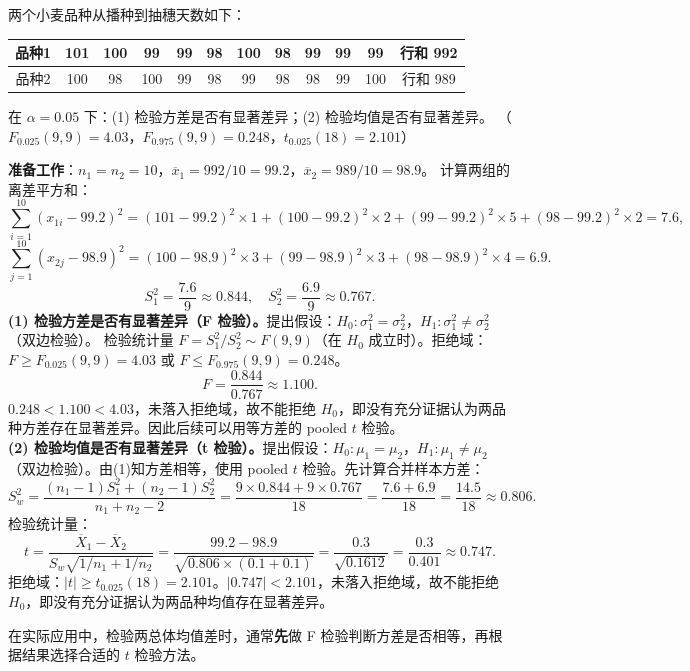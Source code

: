 ﻿\documentclass[lang=cn,11pt]{elegantbook}
\begin{document}
\begin{exercise}\label{exer:9-f-test}
两个小麦品种从播种到抽穗天数如下：
\begin{center}
\begin{tabular}{ccccccccccc|c}
\toprule
品种1 & 101 & 100 & 99 & 99 & 98 & 100 & 98 & 99 & 99 & 99 & 行和 992 \\
\midrule
品种2 & 100 & 98 & 100 & 99 & 98 & 99 & 98 & 98 & 99 & 100 & 行和 989 \\
\bottomrule
\end{tabular}
\end{center}
在 \(\alpha=0.05\) 下：(1) 检验方差是否有显著差异；(2) 检验均值是否有显著差异。
（\(F_{0.025}(9,9)=4.03\)，\(F_{0.975}(9,9)=0.248\)，\(t_{0.025}(18)=2.101\)）
\end{exercise}
\begin{solution}
\textbf{准备工作}：\(n_1=n_2=10\)，\(\overline{x}_1=992/10=99.2\)，\(\overline{x}_2=989/10=98.9\)。
计算两组的离差平方和：
\[
\sum_{i=1}^{10}(x_{1i}-99.2)^2 = (101{-}99.2)^2\!\times\!1 + (100{-}99.2)^2\!\times\!2 + (99{-}99.2)^2\!\times\!5 + (98{-}99.2)^2\!\times\!2 = 7.6,
\]
\[
\sum_{j=1}^{10}(x_{2j}-98.9)^2 = (100{-}98.9)^2\!\times\!3 + (99{-}98.9)^2\!\times\!3 + (98{-}98.9)^2\!\times\!4 = 6.9.
\]
\[
S_1^2 = \frac{7.6}{9} \approx 0.844,\quad S_2^2 = \frac{6.9}{9} \approx 0.767.
\]
\textbf{(1) 检验方差是否有显著差异（F 检验）。}提出假设：\(H_0\colon \sigma_1^2=\sigma_2^2\)，\(H_1\colon \sigma_1^2\neq\sigma_2^2\)（双边检验）。
检验统计量 \(F = S_1^2/S_2^2 \sim F(9,9)\)（在 \(H_0\) 成立时）。拒绝域：\(F \geq F_{0.025}(9,9)=4.03\) 或 \(F \leq F_{0.975}(9,9)=0.248\)。
\[
F = \frac{0.844}{0.767} \approx 1.100.
\]
\(0.248 < 1.100 < 4.03\)，未落入拒绝域，故不能拒绝 \(H_0\)，即没有充分证据认为两品种方差存在显著差异。因此后续可以用等方差的 pooled \(t\) 检验。\\
\textbf{(2) 检验均值是否有显著差异（t 检验）。}提出假设：\(H_0\colon \mu_1=\mu_2\)，\(H_1\colon \mu_1\neq\mu_2\)（双边检验）。由(1)知方差相等，使用 pooled \(t\) 检验。先计算合并样本方差：
\[
S_w^2 = \frac{(n_1-1)S_1^2+(n_2-1)S_2^2}{n_1+n_2-2} = \frac{9\times0.844+9\times0.767}{18} = \frac{7.6+6.9}{18} = \frac{14.5}{18} \approx 0.806.
\]
检验统计量：
\[
t = \frac{\overline{X}_1-\overline{X}_2}{S_w\sqrt{1/n_1+1/n_2}} = \frac{99.2-98.9}{\sqrt{0.806\times(0.1+0.1)}} = \frac{0.3}{\sqrt{0.1612}} = \frac{0.3}{0.401} \approx 0.747.
\]
拒绝域：\(|t| \geq t_{0.025}(18)=2.101\)。\(|0.747| < 2.101\)，未落入拒绝域，故不能拒绝 \(H_0\)，即没有充分证据认为两品种均值存在显著差异。
\begin{note}
在实际应用中，检验两总体均值差时，通常\textbf{先}做 F 检验判断方差是否相等，再根据结果选择合适的 \(t\) 检验方法。
\end{note}
\end{solution}
\end{document}
